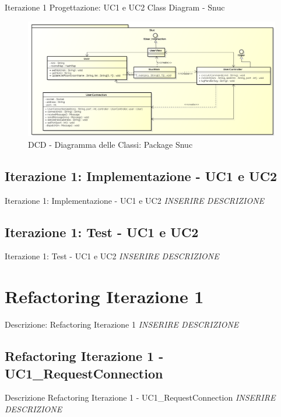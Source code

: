 \documentclass[t]{beamer} %
\begin{document}
\begin{frame} {Iterazione 1 Progettazione: UC1 e UC2 Class Diagram - Snuc}
   \begin{figure}
     \includegraphics[scale=0.26]{image_astah/Iteration_1_DesignModel/ClassDiagramSnuc.png}{\centering}
     \caption{DCD - Diagramma delle Classi: Package Snuc }
     \label{fig_UC1_UC2_DCD_3} 
   \end{figure}
\end{frame}

\subsection {Iterazione 1: Implementazione - UC1 e UC2}
\begin{frame} {Iterazione 1: Implementazione - UC1 e UC2}
 \emph{INSERIRE DESCRIZIONE}
\end{frame}

\subsection{Iterazione 1: Test - UC1 e UC2}
\begin{frame} {Iterazione 1: Test - UC1 e UC2}
 \emph{INSERIRE DESCRIZIONE}
\end{frame}

\section{Refactoring Iterazione 1}
\begin{frame} {Descrizione: Refactoring Iterazione 1}
 \emph{INSERIRE DESCRIZIONE}
\end{frame}

\subsection{Refactoring Iterazione 1 - UC1\_RequestConnection}
\begin{frame} {Descrizione Refactoring Iterazione 1 - UC1\_RequestConnection }
 \emph{INSERIRE DESCRIZIONE}
\end{frame}
\end{document}

